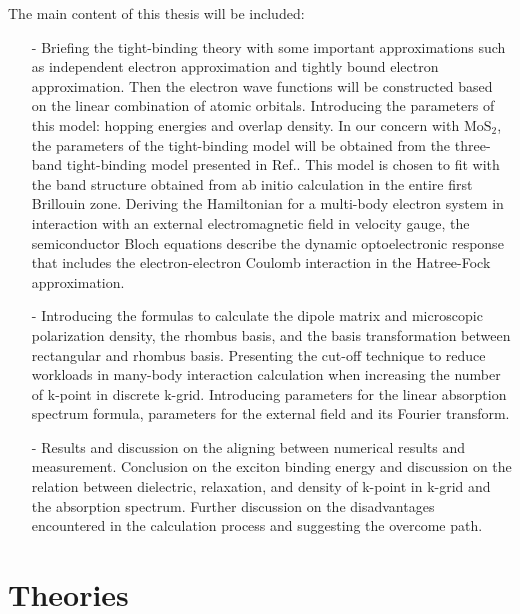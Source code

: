 \documentclass[12pt,english,a4paper]{article}
\begin{document}
The main content of this thesis will be included: 
\begin{itemize}
\item[-] Briefing the tight-binding theory with some important approximations such as independent electron approximation and tightly bound electron approximation. Then the electron wave functions will be constructed based on the linear combination of atomic orbitals. Introducing the parameters of this model: hopping energies and overlap density. In our concern with $\mathrm{MoS}_2$, the parameters of the tight-binding model will be obtained from the three-band tight-binding model presented in Ref.\cite{liu_three-band_2013}. This model is chosen to fit with the band structure obtained from ab initio calculation in the entire first Brillouin zone. Deriving the Hamiltonian for a multi-body electron system in interaction with an external electromagnetic field in velocity gauge, the semiconductor Bloch equations describe the dynamic optoelectronic response that includes the electron-electron Coulomb interaction in the Hatree-Fock approximation.
\item[-] Introducing the formulas to calculate the dipole matrix and microscopic polarization density, the rhombus basis, and the basis transformation between rectangular and rhombus basis. Presenting the cut-off technique to reduce workloads in many-body interaction calculation when increasing the number of k-point in discrete k-grid. Introducing parameters for the linear absorption spectrum formula, parameters for the external field and its Fourier transform.
\item[-] Results and discussion on the aligning between numerical results and measurement. Conclusion on the exciton binding energy and discussion on the relation between dielectric, relaxation, and density of k-point in k-grid and the absorption spectrum. Further discussion on the disadvantages encountered in the calculation process and suggesting the overcome path. 
	\end{itemize}
	\newpage
	\section{Theories}
\end{document}
